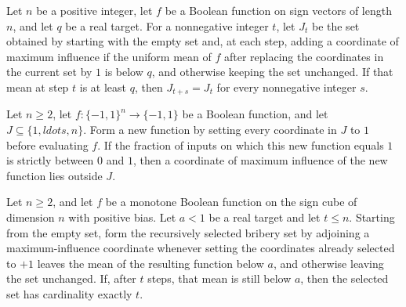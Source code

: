 \begin{theorem}
\label{FABL.briberySetsTo_stable}
\leanok
{}
Let $n$ be a positive integer, let $f$ be a Boolean function on sign vectors of length
$n$, and let $q$ be a real target. For a nonnegative integer $t$, let $J_t$ be the set
obtained by starting with the empty set and, at each step, adding a coordinate of
maximum influence if the uniform mean of $f$ after replacing the coordinates in the
current set by $1$ is below $q$, and otherwise keeping the set unchanged. If that mean
at step $t$ is at least $q$, then $J_{t+s}=J_t$ for every nonnegative integer $s$.
\end{theorem}

\begin{theorem}
\label{FABL.maximumInfluenceCoordinate_fresh_of_bias}
\leanok
{}
Let $n\ge 2$, let $f:\{-1,1\}^n\to\{-1,1\}$ be a Boolean function, and let
$J\subseteq\{1,ldots,n\}$. Form a new function by setting every coordinate in $J$ to $1$
before evaluating $f$. If the fraction of inputs on which this new function equals $1$
is strictly between $0$ and $1$, then a coordinate of maximum influence of the new
function lies outside $J$.
\end{theorem}

\begin{theorem}
\label{FABL.card_briberySetsTo_eq_of_mean_lt}
\leanok
{}
Let $n\ge 2$, and let $f$ be a monotone Boolean function on the sign cube of dimension
$n$ with positive bias. Let $a<1$ be a real target and let $t\le n$. Starting from the
empty set, form the recursively selected bribery set by adjoining a maximum-influence
coordinate whenever setting the coordinates already selected to $+1$ leaves the mean of
the resulting function below $a$, and otherwise leaving the set unchanged. If, after $t$
steps, that mean is still below $a$, then the selected set has cardinality exactly $t$.
\end{theorem}


